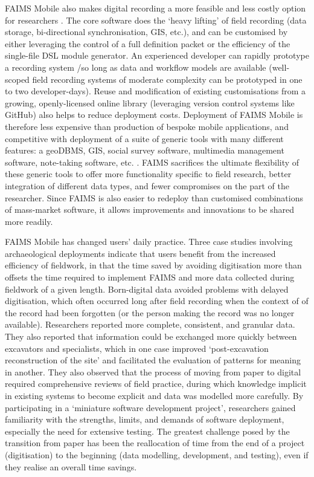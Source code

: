 \documentclass[preprint,12pt, a4paper]{elsarticle}
\begin{document}
FAIMS Mobile also makes digital recording a more feasible and less costly option for researchers \cite{Sobotkova2016-mx, Sobotkova2015-lq}. The core software does the `heavy lifting' of field recording (data storage, bi-directional synchronisation, GIS, etc.), and can be customised by either leveraging the control of a full definition packet or the efficiency of the single-file DSL module generator. An experienced developer can rapidly prototype a recording system /so long as data and workflow models are available (well-scoped field recording systems of moderate complexity can be prototyped in one to two developer-days). Reuse and modification of existing customisations from a growing, openly-licensed online library (leveraging version control systems like GitHub) also helps to reduce deployment costs\cite{Ross2015-mo}. Deployment of FAIMS Mobile is therefore less expensive than production of bespoke mobile applications, and competitive with deployment of a suite of generic tools with many different features: a geoDBMS, GIS, social survey software, multimedia management software, note-taking software, etc. \cite{Carter2016-jm}. FAIMS sacrifices the ultimate flexibility of these generic tools to offer more functionality specific to field research, better integration of different data types, and fewer compromises on the part of the researcher. Since FAIMS is also easier to redeploy than customised combinations of mass-market software, it allows improvements and innovations to be shared more readily\cite{Ross2015-mo}.  

FAIMS Mobile has changed users' daily practice. Three case studies involving archaeological deployments \cite{Sobotkova2016-mx} indicate that users benefit from the increased efficiency of fieldwork, in that the time saved by avoiding digitisation more than offsets the time required to implement FAIMS and more data collected during fieldwork of a given length. Born-digital data avoided problems with delayed digitisation, which often occurred long after field recording when the context of of the record had been forgotten (or the person making the record was no longer available). Researchers reported more complete, consistent, and granular data. They also reported that information could be exchanged more quickly between excavators and specialists, which in one case improved `post-excavation reconstruction of the site' and facilitated the evaluation of patterns for meaning in another. They also observed that the process of moving from paper to digital required comprehensive reviews of field practice, during which knowledge implicit in existing systems to become explicit and data was modelled more carefully. By participating in a `miniature software development project', researchers gained familiarity with the strengths, limits, and demands of software deployment, especially the need for extensive testing. The greatest challenge posed by the transition from paper has been the reallocation of time from the end of a project (digitisation) to the beginning (data modelling, development, and testing), even if they realise an overall time savings. 
\end{document}
